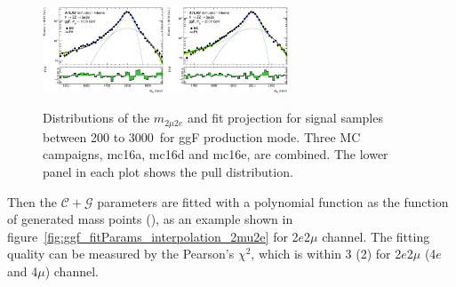 \begin{figure}[htbp]
    \includegraphics[width=0.32\textwidth]{figures/HMHZZ/signal/NWA//ggf_mass_signal_1800_H4l_2mu2e.eps}
    \includegraphics[width=0.32\textwidth]{figures/HMHZZ/signal/NWA//ggf_mass_signal_2000_H4l_2mu2e.eps}
    \caption{Distributions of the $m_{2\mu 2e}$ and fit projection for signal samples between 200 to 3000~\gev for ggF production mode. 
    Three MC campaigns, mc16a, mc16d and mc16e, are combined. 
    The lower panel in each plot shows the pull distribution.}
    \label{fig:ggf_mass_signalParam_2mu2e}
\end{figure}

Then the $\mathcal{C}+\mathcal{G}$ parameters are fitted with a polynomial function as the function of generated mass points (\mH), as an example shown in figure~\ref{fig:ggf_fitParams_interpolation_2mu2e} for 2$e$2$\mu$ channel.
The fitting quality can be measured by the Pearson's $\chi^2$, which is within 3 (2) for 2$e$2$\mu$ (4$e$ and 4$\mu$) channel.

